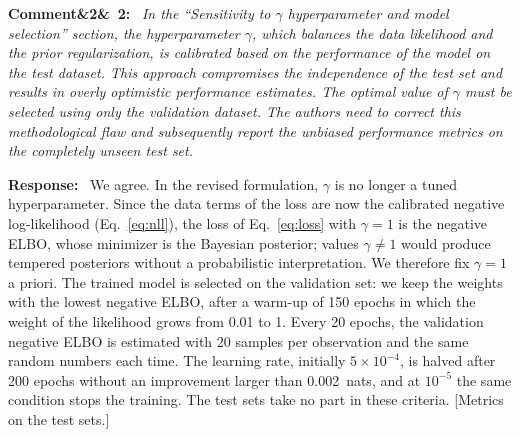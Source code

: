\documentclass[11pt]{article}
\newenvironment{rcomment}[1]{\par\bigskip\noindent\textbf{Comment\ifx&#1&\else\ #1\fi:}\ \itshape}{\par}
\newenvironment{response}{\par\smallskip\noindent\color{resp}\textbf{Response:}\ }{\par}
\newcommand{\tbd}[1]{\textcolor{note}{\textsf{[#1]}}}
\begin{document}
\begin{rcomment}{2}
In the ``Sensitivity to $\gamma$ hyperparameter and model selection'' section, the hyperparameter $\gamma$, which
balances the data likelihood and the prior regularization, is calibrated based on the performance of the model on the
test dataset. This approach compromises the independence of the test set and results in overly optimistic performance
estimates. The optimal value of $\gamma$ must be selected using only the validation dataset. The authors need to
correct this methodological flaw and subsequently report the unbiased performance metrics on the completely unseen test
set.
\end{rcomment}

\begin{response}
We agree. In the revised formulation, $\gamma$ is no longer
a tuned hyperparameter. Since the data terms of the loss are now the calibrated negative log-likelihood
(Eq.~\eqref{eq:nll}), the loss of Eq.~\eqref{eq:loss} with $\gamma=1$ is the negative ELBO, whose minimizer is the
Bayesian posterior; values $\gamma\neq1$ would produce tempered posteriors without a probabilistic interpretation. We
therefore fix $\gamma=1$ a priori. The trained model is selected on the validation set: we keep the weights with the
lowest negative ELBO, after a warm-up of 150 epochs in which the weight of the likelihood grows from 0.01 to 1. Every 20
epochs, the validation negative ELBO is estimated with 20 samples per observation and the same random numbers each time.
The learning rate, initially $5\times10^{-4}$, is halved after 200 epochs without an improvement larger than 0.002~nats,
and at $10^{-5}$ the same condition stops the training. 
The test sets take no part in these criteria.
\tbd{Metrics on the test sets.}


\end{response}
\end{document}
